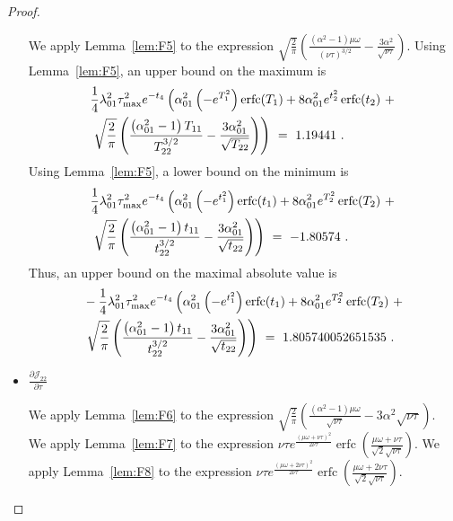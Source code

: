 \documentclass{article}
\DeclareMathOperator{\erfc}{erfc}
\begin{document}
\begin{proof}
\begin{itemize}
We apply Lemma~\ref{lem:F5} to the expression
$\sqrt{\frac{2}{\pi }} \left(\frac{\left(\alpha ^2-1\right) \mu \omega}{(\nu \tau)^{3/2}}-\frac{3 \alpha ^2}{\sqrt{\nu \tau}}\right)$.
Using  Lemma~\ref{lem:F5}, an upper bound on the maximum is
\begin{align}
&\frac{1}{4} \lambda_{\rm 01}^2 \tau_{\rm max}^2 e^{-t_4}
  \left(\alpha_{\rm 01}^2 \left(-e^{T_1^2}\right)
  \erfc (T_1)+8 \alpha_{\rm 01}^2
  e^{t_2^2} \erfc (t_2)\ + \right. \\
  \nonumber &\left. \sqrt{\frac{2}{\pi }}
  \left(\frac{\left(\alpha_{\rm 01}^2-1\right)
  T_{11}}{T_{22}^{3/2}}-\frac{3 \alpha_{\rm 01}^2}{\sqrt{T_{22}}}\right)\right) \ = \
1.19441 \ .
\end{align}
Using  Lemma~\ref{lem:F5}, a lower bound on the minimum is
\begin{align}
&\frac{1}{4} \lambda_{\rm 01}^2 \tau_{\rm max}^2 e^{-t_4}
  \left(\alpha_{\rm 01}^2 \left(-e^{t_1^2}\right)
  \erfc (t_1)+8 \alpha_{\rm 01}^2
  e^{T_2^2} \erfc (T_2)\ + \right. \\
  \nonumber &\left. \sqrt{\frac{2}{\pi }}
  \left(\frac{\left(\alpha_{\rm 01}^2-1\right)
  t_{11}}{t_{22}^{3/2}}-\frac{3 \alpha_{\rm 01}^2}{\sqrt{t_{22}}}\right)\right) \ = \
-1.80574 \ .
\end{align}
Thus, an upper bound on the maximal absolute value is 
\begin{align}
&-\frac{1}{4} \lambda_{\rm 01}^2 \tau_{\rm max}^2 e^{-t_4}
  \left(\alpha_{\rm 01}^2 \left(-e^{t_1^2}\right)
  \erfc (t_1)+8 \alpha_{\rm 01}^2
  e^{T_2^2} \erfc (T_2)\ + \right. \\
  \nonumber &\left. \sqrt{\frac{2}{\pi }}
  \left(\frac{\left(\alpha_{\rm 01}^2-1\right)
  t_{11}}{t_{22}^{3/2}}-\frac{3 \alpha_{\rm 01}^2}{\sqrt{t_{22}}}\right)\right) \ = \
1.805740052651535 \ .
\end{align}

\item $\frac{\partial {\mathcal J}_{22}}{\partial \tau}$

We apply Lemma~\ref{lem:F6} to the expression
$\sqrt{\frac{2}{\pi }} \left(\frac{\left(\alpha ^2-1\right) \mu
    \omega}{\sqrt{\nu \tau}}-3 \alpha ^2 \sqrt{\nu
    \tau}\right)$. \\
We apply Lemma~\ref{lem:F7} to the expression 
$\nu \tau e^{\frac{(\mu \omega+\nu \tau)^2}{2 \nu \tau}} \erfc \left(\frac{\mu \omega+\nu \tau}{\sqrt{2} \sqrt{\nu \tau}}\right)$. 
We apply Lemma~\ref{lem:F8} to the expression
$\nu \tau e^{\frac{(\mu \omega+2 \nu \tau)^2}{2 \nu \tau}} \erfc \left(\frac{\mu \omega+2 \nu \tau}{\sqrt{2} \sqrt{\nu \tau}}\right)$. 


\end{itemize}
\end{proof}
\end{document}
